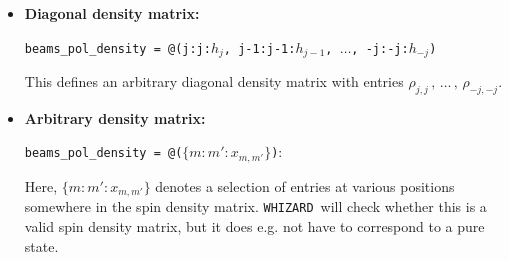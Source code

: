 \documentclass[12pt]{book}
\newcommand{\ttt}[1]{\texttt{#1}}
\newcommand{\whizard}{\ttt{WHIZARD}}
\begin{document}
{\begin{itemize}
\begin{center}
  \end{center}
This example describes polarization along an arbitrary axis in polar
coordinates (polar axis in positive $z$ direction, polar angle
$\theta$, azimuthal angle $\phi$). A fraction $f$ of the particles are
polarized, the remainder is unpolarized. Note that, although axis
polarization defines a valid density matrix for all particles with
multiplicity $>1$, it is meaningful only for particles with spin
$\frac{1}{2}$. Valid ranges for the parameters are $f \in
\left[0\;;\;1\right]$, $\theta \in \mathbb{R}$, $\phi \in
\mathbb{R}$. The density matrix then has the form:
\[ \rho = \frac{1}{2}\cdot
\cssparse{1 - f\cos\theta}{1 + f\cos\theta}
   {f\sin\theta\, e^{-i\phi}}{f\sin\theta\, e^{i\phi}}
\]
%
\item {\bf Diagonal density matrix:}
  \begin{center}
    \begin{footnotesize}
    \ttt{beams\_pol\_density = @(j:j:$h_j$, j-1:j-1:$h_{j-1}$,
      $\ldots$, -j:-j:$h_{-j}$)}
    \end{footnotesize}
  \end{center}
This defines an arbitrary diagonal density matrix with entries
$\rho_{j,j}\,,\,\dots\,,\,\rho_{-j,-j}$.
%
\item {\bf Arbitrary density matrix:}
  \begin{center}
    \begin{footnotesize}
    \ttt{beams\_pol\_density = @($\{m:m':x_{m,m'}\}$)}:
    \end{footnotesize}
  \end{center}
Here, \ttt{$\{m:m':x_{m,m'}\}$} denotes a selection of entries at
various positions somewhere in the spin density matrix. \whizard\
will check whether this is a valid spin density matrix, but it does
e.g. not have to correspond to a pure state.
%
\end{itemize}
}
%
\end{document}

